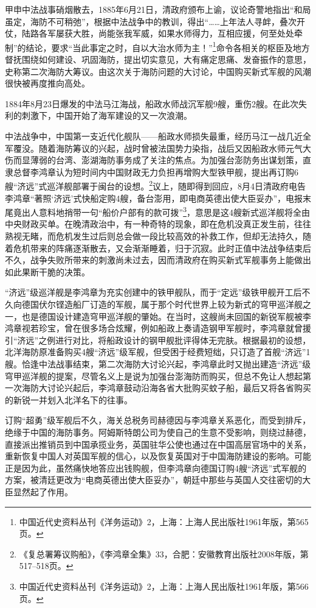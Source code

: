 \documentclass[12pt,UTF8]{ctexbook}
\begin{document}
甲申中法战事硝烟散去，1885年6月21日，清政府颁布上谕，议论奇警地指出“和局虽定，海防不可稍弛”，根据中法战争中的教训，得出“……上年法人寻衅，叠次开仗，陆路各军屡获大胜，尚能张我军威，如果水师得力，互相应援，何至处处牵制”的结论，要求“当此事定之时，自以大治水师为主！”\footnote{中国近代史资料丛刊《洋务运动》2，上海：上海人民出版社1961年版，第565页。}命令各相关的枢臣及地方督抚围绕如何建设、巩固海防，提出切实意见，大有痛定思痛、发奋振作的意思，史称第二次海防大筹议。由这次关于海防问题的大讨论，中国购买新式军舰的风潮很快被再度推向高处。

1884年8月23日爆发的中法马江海战，船政水师战沉军舰9艘，重伤2艘。在此次失利的刺激下，中国开始了海军建设的又一次浪潮。

中法战争中，中国第一支近代化舰队——船政水师损失最重，经历马江一战几近全军覆没。随着海防筹议的兴起，战时曾被法国势力染指，战后又因船政水师元气大伤而显薄弱的台湾、澎湖海防事务成了关注的焦点。为加强台澎防务出谋划策，直隶总督李鸿章认为短时间内中国财政无力负担再增购大型铁甲舰，提出再订购6艘“济远”式巡洋舰部署于闽台的设想。\footnote{《复总署筹议购船》，《李鸿章全集》33，合肥：安徽教育出版社2008年版，第517--518页。}议上，随即得到回应，8月4日清政府电告李鸿章“著照‘济远’式快船定购4艘，备台澎用，即电商英德出使大臣妥办”，电报末尾竟出人意料地捎带一句“船价户部有的款可拨”\footnote{中国近代史资料丛刊《洋务运动》2，上海：上海人民出版社1961年版，第566页。}，意思是这4艘新式巡洋舰将全由中央财政买单。在晚清政治中，有一种奇特的现象，即在危机没真正发生前，往往熟视无睹，而危机发生过后则总会做一段比较高效的补救工作，但却无法持久，随着危机带来的阵痛逐渐散去，又会渐渐睡着，归于沉寂。此时正值中法战争结束后不久，战争失败所带来的刺激尚未过去，因而清政府在购买新式军舰事务上能做出如此果断干脆的决策。

“济远”级巡洋舰是李鸿章为充实创建中的铁甲舰队，而于“定远”级铁甲舰开工后不久向德国伏尔铿造船厂订造的军舰，属于那个时代世界上较为新式的穹甲巡洋舰之一，也是德国设计建造穹甲巡洋舰的肇始。在当时，这艘尚未回国的新锐军舰被李鸿章视若珍宝，曾在很多场合炫耀，例如船政上奏请造钢甲军舰时，李鸿章就曾援引“济远”之例进行对比，将船政设计的钢甲舰批评得体无完肤。根据最初的设想，北洋海防原准备购买4艘“济远”级军舰，但受困于经费短绌，只订造了首舰“济远”1艘。恰逢中法战事结束，第二次海防大讨论兴起，李鸿章此时又抛出建造“济远”级穹甲巡洋舰的提案，尽管名义上是说为加强台澎海防而购买，但总不免让人想起第一次海防大讨论兴起后，李鸿章鼓动沿海各省大批购买蚊子船，最后又将各省购买的新锐一并划入北洋名下的往事。

订购“超勇”级军舰后不久，海关总税务司赫德因与李鸿章关系恶化，而受到排斥，绝缘于中国的海防事务。阿姆斯特朗公司为使自己的生意不受影响，则绕过赫德，直接派出推销员到中国承揽业务，英国驻华公使也通过在中国高层官场中的关系，重新恢复中国人对英国军舰的信心，以及恢复英国对于中国海防建设的影响。可能正是因为此，虽然痛快地答应出钱购舰，但李鸿章向德国订购4艘“济远”式军舰的方案，被清廷更改为“电商英德出使大臣妥办”，朝廷中那些与英国人交往密切的大臣显然起了作用。
\end{document}
